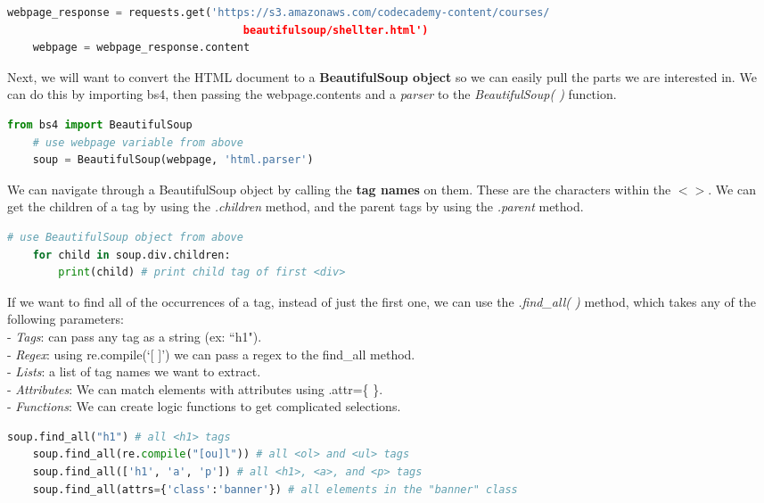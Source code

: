 \documentclass[11pt, a4paper]{article}
\begin{document}
\begin{spacing}{1.1}
\begin{lstlisting}[language=Python]
	webpage_response = requests.get('https://s3.amazonaws.com/codecademy-content/courses/
	                                 beautifulsoup/shellter.html')
	webpage = webpage_response.content \end{lstlisting}\vspace*{1mm}
	Next, we will want to convert the HTML document to a \textbf{BeautifulSoup object} so we can easily pull the parts we are interested in. We can do this by importing bs4, then passing the webpage.contents and a \textit{parser} to the \textit{BeautifulSoup( )} function.
	\begin{lstlisting}[language=Python]
	from bs4 import BeautifulSoup
	# use webpage variable from above
	soup = BeautifulSoup(webpage, 'html.parser') \end{lstlisting} \newpage

	\noindent We can navigate through a BeautifulSoup object by calling the \textbf{tag names} on them. These are the characters within the $< >$. We can get the children of a tag by using the \textit{.children} method, and the parent tags by using the \textit{.parent} method.
	\begin{lstlisting}[language=Python]
	# use BeautifulSoup object from above
	for child in soup.div.children:
		print(child) # print child tag of first <div> \end{lstlisting}\vspace*{1mm} 
	If we want to find all of the occurrences of a tag, instead of just the first one, we can use the \textit{.find\_all( )} method, which takes any of the following parameters: \\
	\hspace*{3mm} - \textit{Tags}: can pass any tag as a string (ex: ``h1"). \\
	\hspace*{3mm} - \textit{Regex}: using re.compile(`[ ]') we can pass a regex to the find\_all method. \\
	\hspace*{3mm} - \textit{Lists}: a list of tag names we want to extract. \\
	\hspace*{3mm} - \textit{Attributes}: We can match elements with attributes using .attr=\{ \}. \\
	\hspace*{3mm} - \textit{Functions}: We can create logic functions to get complicated selections.
	\begin{lstlisting}[language=Python]
	soup.find_all("h1") # all <h1> tags
	soup.find_all(re.compile("[ou]l")) # all <ol> and <ul> tags
	soup.find_all(['h1', 'a', 'p']) # all <h1>, <a>, and <p> tags
	soup.find_all(attrs={'class':'banner'}) # all elements in the "banner" class
	

\end{lstlisting}
\end{spacing}
\end{document}
